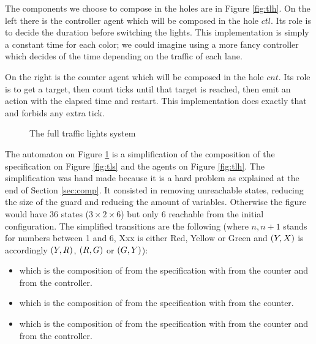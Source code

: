 \documentclass{article}
\begin{document}
The components we choose to compose in the holes are in Figure \ref{fig:tlh}.
On the left there is the controller agent which will be composed in the hole \(ctl\).
Its role is to decide the duration before switching the lights.
This implementation is simply a constant time for each color; we could imagine using a more fancy controller which decides of the time depending on the traffic of each lane.

On the right is the counter agent which will be composed in the hole \(cnt\).
Its role is to get a target, then count ticks until that target is reached, then emit an action with the elapsed time and restart.
This implementation does exactly that and forbids any extra tick.

\begin{figure}
\centering

\caption{The full traffic lights system}
\label{fig:tlf}
\end{figure}
The automaton on Figure \ref{fig:tlf} is a simplification of the composition of the specification on Figure \ref{fig:tls} and the agents on Figure \ref{fig:tlh}.
The simplification was hand made because it is a hard problem as explained at the end of Section \ref{sec:comp}.
It consisted in removing unreachable states, reducing the size of the guard and reducing the amount of variables.
Otherwise the figure would have 36 states (\(3 \times 2 \times 6\)) but only 6 reachable from the initial configuration.
The simplified transitions are the following (where \(n, n+1\) stands for numbers between 1 and 6, Xxx is either Red, Yellow or Green and \({\left(Y, X\right)}\) is accordingly \({\left(Y, R\right)}\), \({\left(R, G\right)}\) or \({\left(G, Y\right)}\)):
\begin{itemize}
\item {} which is the composition of  from the specification with  from the counter and  from the controller.
\item {} which is the composition of  from the specification with  from the counter.
\item {} which is the composition of  from the specification with  from the counter and  from the controller.
\end{itemize}
\end{document}
